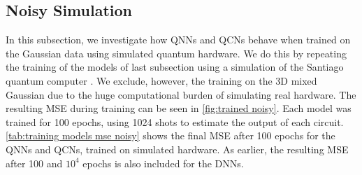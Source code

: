 \subsection{Noisy Simulation}\label{sec:Noisy Simulation}
In this subsection, we investigate how QNNs and QCNs behave when trained on the Gaussian data using simulated quantum hardware. We do this by repeating the training of the models of last subsection using a simulation of the Santiago quantum computer \cite{santiago}. We exclude, however, the training on the 3D mixed Gaussian due to the huge computational burden of simulating real hardware. The resulting MSE during training can be seen in \autoref{fig:trained noisy}. Each model was trained for 100 epochs, using 1024 shots to estimate the output of each circuit. \autoref{tab:training models mse noisy} shows the final MSE after 100 epochs for the QNNs and QCNs, trained on simulated hardware. As earlier, the resulting MSE after 100 and $10^{4}$ epochs is also included for the DNNs.



